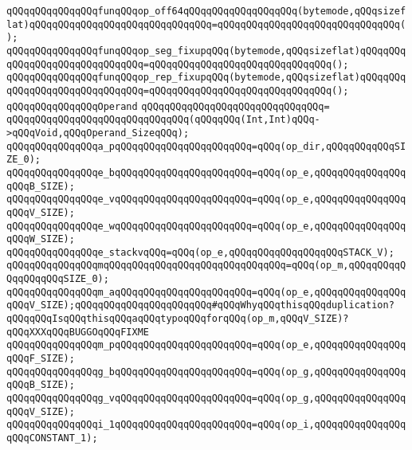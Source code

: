 \verb|qQQqqQQqqQQqqQQqfunqQQqop_off64qQQqqQQqqQQqqQQqqQQq(bytemode,qQQqsizeflat)qQQqqQQqqQQqqQQqqQQqqQQqqQQqqQQq=qQQqqQQqqQQqqQQqqQQqqQQqqQQqqQQq();|\newline
\verb|qQQqqQQqqQQqqQQqfunqQQqop_seg_fixupqQQq(bytemode,qQQqsizeflat)qQQqqQQqqQQqqQQqqQQqqQQqqQQqqQQq=qQQqqQQqqQQqqQQqqQQqqQQqqQQqqQQq();|\newline
\verb|qQQqqQQqqQQqqQQqfunqQQqop_rep_fixupqQQq(bytemode,qQQqsizeflat)qQQqqQQqqQQqqQQqqQQqqQQqqQQqqQQq=qQQqqQQqqQQqqQQqqQQqqQQqqQQqqQQq();|\newline
\newline
\verb|qQQqqQQqqQQqqQQqOperand|\newline
\verb|qQQqqQQqqQQqqQQqqQQqqQQqqQQqqQQq=|\newline
\verb|qQQqqQQqqQQqqQQqqQQqqQQqqQQqqQQq(qQQqqQQq(Int,Int)qQQq->qQQqVoid,qQQqOperand_SizeqQQq);|\newline
\newline
\verb|qQQqqQQqqQQqqQQqa_pqQQqqQQqqQQqqQQqqQQqqQQq=qQQq(op_dir,qQQqqQQqqQQqSIZE_0);|\newline
\verb|qQQqqQQqqQQqqQQqe_bqQQqqQQqqQQqqQQqqQQqqQQq=qQQq(op_e,qQQqqQQqqQQqqQQqqQQqB_SIZE);|\newline
\verb|qQQqqQQqqQQqqQQqe_vqQQqqQQqqQQqqQQqqQQqqQQq=qQQq(op_e,qQQqqQQqqQQqqQQqqQQqV_SIZE);|\newline
\verb|qQQqqQQqqQQqqQQqe_wqQQqqQQqqQQqqQQqqQQqqQQq=qQQq(op_e,qQQqqQQqqQQqqQQqqQQqW_SIZE);|\newline
\verb|qQQqqQQqqQQqqQQqe_stackvqQQq=qQQq(op_e,qQQqqQQqqQQqqQQqqQQqSTACK_V);|\newline
\verb|qQQqqQQqqQQqqQQqmqQQqqQQqqQQqqQQqqQQqqQQqqQQqqQQq=qQQq(op_m,qQQqqQQqqQQqqQQqqQQqSIZE_0);|\newline
\verb|qQQqqQQqqQQqqQQqm_aqQQqqQQqqQQqqQQqqQQqqQQq=qQQq(op_e,qQQqqQQqqQQqqQQqqQQqV_SIZE);qQQqqQQqqQQqqQQqqQQqqQQq#qQQqWhyqQQqthisqQQqduplication?qQQqqQQqIsqQQqthisqQQqaqQQqtypoqQQqforqQQq(op_m,qQQqV_SIZE)?qQQqXXXqQQqBUGGOqQQqFIXME|\newline
\verb|qQQqqQQqqQQqqQQqm_pqQQqqQQqqQQqqQQqqQQqqQQq=qQQq(op_e,qQQqqQQqqQQqqQQqqQQqF_SIZE);|\newline
\verb|qQQqqQQqqQQqqQQqg_bqQQqqQQqqQQqqQQqqQQqqQQq=qQQq(op_g,qQQqqQQqqQQqqQQqqQQqB_SIZE);|\newline
\verb|qQQqqQQqqQQqqQQqg_vqQQqqQQqqQQqqQQqqQQqqQQq=qQQq(op_g,qQQqqQQqqQQqqQQqqQQqV_SIZE);|\newline
\verb|qQQqqQQqqQQqqQQqi_1qQQqqQQqqQQqqQQqqQQqqQQq=qQQq(op_i,qQQqqQQqqQQqqQQqqQQqCONSTANT_1);|\newline
